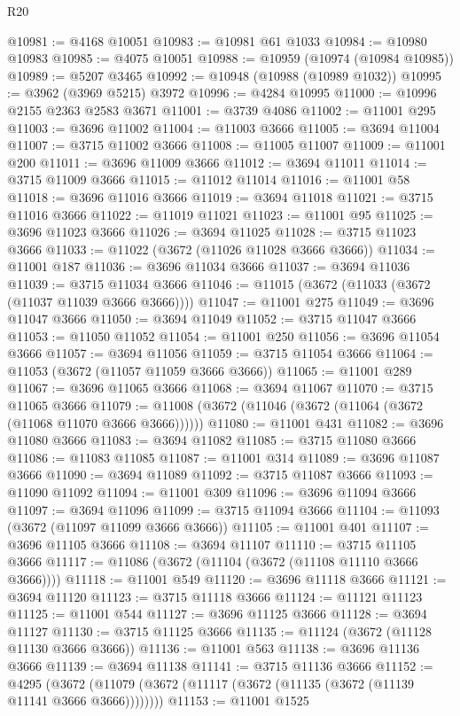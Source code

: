 \begin{lexlean}{R20}
\begin{coremodule}
@10981 := @4168 @10051
@10983 := @10981 @61 @1033
@10984 := @10980 @10983
@10985 := @4075 @10051
@10988 := @10959 (@10974 (@10984 @10985))
@10989 := @5207 @3465
@10992 := @10948 (@10988 (@10989 @1032))
@10995 := @3962 (@3969 @5215) @3972
@10996 := @4284 @10995
@11000 := @10996 @2155 @2363 @2583 @3671
@11001 := @3739 @4086
@11002 := @11001 @295
@11003 := @3696 @11002
@11004 := @11003 @3666
@11005 := @3694 @11004
@11007 := @3715 @11002 @3666
@11008 := @11005 @11007
@11009 := @11001 @200
@11011 := @3696 @11009 @3666
@11012 := @3694 @11011
@11014 := @3715 @11009 @3666
@11015 := @11012 @11014
@11016 := @11001 @58
@11018 := @3696 @11016 @3666
@11019 := @3694 @11018
@11021 := @3715 @11016 @3666
@11022 := @11019 @11021
@11023 := @11001 @95
@11025 := @3696 @11023 @3666
@11026 := @3694 @11025
@11028 := @3715 @11023 @3666
@11033 := @11022 (@3672 (@11026 @11028 @3666 @3666))
@11034 := @11001 @187
@11036 := @3696 @11034 @3666
@11037 := @3694 @11036
@11039 := @3715 @11034 @3666
@11046 := @11015 (@3672 (@11033 (@3672 (@11037 @11039 @3666 @3666))))
@11047 := @11001 @275
@11049 := @3696 @11047 @3666
@11050 := @3694 @11049
@11052 := @3715 @11047 @3666
@11053 := @11050 @11052
@11054 := @11001 @250
@11056 := @3696 @11054 @3666
@11057 := @3694 @11056
@11059 := @3715 @11054 @3666
@11064 := @11053 (@3672 (@11057 @11059 @3666 @3666))
@11065 := @11001 @289
@11067 := @3696 @11065 @3666
@11068 := @3694 @11067
@11070 := @3715 @11065 @3666
@11079 := @11008 (@3672 (@11046 (@3672 (@11064 (@3672 (@11068 @11070 @3666 @3666))))))
@11080 := @11001 @431
@11082 := @3696 @11080 @3666
@11083 := @3694 @11082
@11085 := @3715 @11080 @3666
@11086 := @11083 @11085
@11087 := @11001 @314
@11089 := @3696 @11087 @3666
@11090 := @3694 @11089
@11092 := @3715 @11087 @3666
@11093 := @11090 @11092
@11094 := @11001 @309
@11096 := @3696 @11094 @3666
@11097 := @3694 @11096
@11099 := @3715 @11094 @3666
@11104 := @11093 (@3672 (@11097 @11099 @3666 @3666))
@11105 := @11001 @401
@11107 := @3696 @11105 @3666
@11108 := @3694 @11107
@11110 := @3715 @11105 @3666
@11117 := @11086 (@3672 (@11104 (@3672 (@11108 @11110 @3666 @3666))))
@11118 := @11001 @549
@11120 := @3696 @11118 @3666
@11121 := @3694 @11120
@11123 := @3715 @11118 @3666
@11124 := @11121 @11123
@11125 := @11001 @544
@11127 := @3696 @11125 @3666
@11128 := @3694 @11127
@11130 := @3715 @11125 @3666
@11135 := @11124 (@3672 (@11128 @11130 @3666 @3666))
@11136 := @11001 @563
@11138 := @3696 @11136 @3666
@11139 := @3694 @11138
@11141 := @3715 @11136 @3666
@11152 := @4295
    (@3672 (@11079 (@3672 (@11117 (@3672 (@11135 (@3672 (@11139 @11141 @3666 @3666))))))))
@11153 := @11001 @1525

\end{coremodule}
\end{lexlean}
